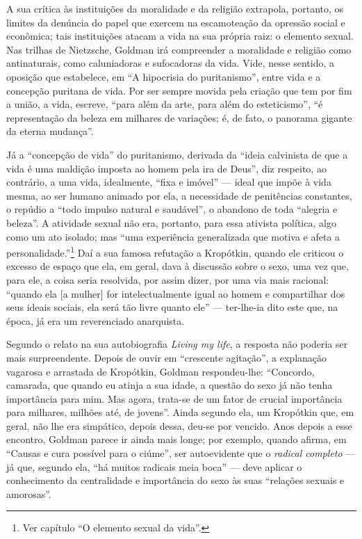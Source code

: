 A sua crítica às instituições da moralidade e da religião extrapola,
portanto, os limites da denúncia do papel que exercem na escamoteação da
opressão social e econômica; tais instituições atacam a vida na sua
própria raiz: o elemento sexual. Nas trilhas de Nietzsche, Goldman
irá compreender a moralidade e religião como antinaturais, como
caluniadoras e sufocadoras da vida. Vide, nesse sentido, a oposição que
estabelece, em ``A hipocrisia do puritanismo'', entre vida e a concepção
puritana de vida. Por ser sempre movida pela criação que tem por fim a
união, a vida, escreve, ``para além da arte, para além do esteticismo'',
``é representação da beleza em milhares de variações; é, de fato, o
panorama gigante da eterna mudança''. 

Já a ``concepção de vida'' do
puritanismo, derivada da ``ideia calvinista de que a vida é uma maldição
imposta ao homem pela ira de Deus'', diz respeito, ao contrário, a uma
vida, idealmente, ``fixa e imóvel'' --- ideal que impõe à vida mesma, ao
ser humano animado por ela, a necessidade de penitências constantes, o
repúdio a ``todo impulso natural e saudável'', o abandono de toda
``alegria e beleza''. A atividade sexual não era, portanto, para
essa ativista política, algo como um ato isolado; mas ``uma
experiência generalizada que motiva e afeta a personalidade.''\footnote{Ver capítulo ``O
elemento sexual da vida''.} Daí a sua famosa refutação a Kropótkin,
quando ele criticou o excesso de espaço que ela, em geral, dava à
discussão sobre o sexo, uma vez que, para ele, a coisa seria resolvida,
por assim dizer, por uma via mais racional: ``quando ela {[}a mulher{]}
for intelectualmente igual ao homem e compartilhar dos seus ideais
sociais, ela será tão livre quanto ele'' --- ter-lhe-ia dito este que, na
época, já era um reverenciado anarquista. 

Segundo o relato na sua
autobiografia \textit{Living my life}, a resposta não poderia ser mais
surpreendente. Depois de ouvir em ``crescente agitação'', a explanação
vagarosa e arrastada de Kropótkin, Goldman respondeu-lhe: ``Concordo,
camarada, que quando eu atinja a sua idade, a questão do sexo já não
tenha importância para mim. Mas agora, trata-se de um fator de
crucial importância para milhares, milhões até, de jovens''. Ainda
segundo ela, um Kropótkin que, em geral, não lhe era simpático, depois
dessa, deu-se por vencido. Anos depois a esse encontro, Goldman parece
ir ainda mais longe; por exemplo, quando afirma, em ``Causas e cura
possível para o ciúme'', ser autoevidente que o \textit{radical completo} ---
já que, segundo ela, ``há muitos radicais meia boca'' --- deve aplicar o
conhecimento da centralidade e importância do sexo às suas ``relações
sexuais e amorosas''. 

